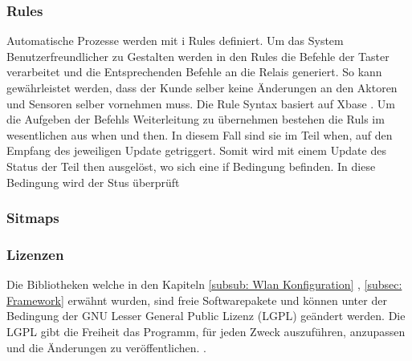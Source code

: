 \subsubsection{Rules} 
Automatische Prozesse werden mit i Rules definiert. Um das System Benutzerfreundlicher zu Gestalten werden in den Rules die Befehle der Taster verarbeitet und die Entsprechenden Befehle an die Relais generiert. So kann gewährleistet werden, dass der Kunde selber keine Änderungen an den Aktoren und Sensoren selber vornehmen muss. Die Rule Syntax basiert auf Xbase \cite{noauthor_xtext_nodate}. Um die Aufgeben der Befehls Weiterleitung zu übernehmen bestehen die Ruls im wesentlichen aus when und then. In diesem Fall sind sie im Teil when, auf den Empfang des jeweiligen Update getriggert. Somit wird mit einem Update des Status der Teil then ausgelöst, wo sich eine if Bedingung befinden. In diese Bedingung wird der Stus überprüft      

\subsubsection{Sitmaps} 

 
   
\subsubsection{Lizenzen} 
Die Bibliotheken welche in den Kapiteln \ref{subsub: Wlan Konfiguration} , \ref{subsec: Framework} erwähnt wurden, sind freie Softwarepakete und können unter der Bedingung der GNU Lesser General Public Lizenz (LGPL) geändert werden. Die LGPL gibt die Freiheit das Programm, für jeden Zweck auszuführen, anzupassen und die Änderungen zu veröffentlichen. \cite{noauthor_gnu.org_nodate}.


 
